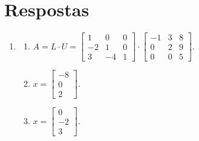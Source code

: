 \documentclass[12pt,a4paper]{article}
\begin{document}
\newpage
\section*{Respostas}
\begin{enumerate}
\item
\begin{enumerate}
\item $A = L \cdot U =
\begin{bmatrix}
 1 &  0 & 0 \\
-2 &  1 & 0 \\
 3 & -4 & 1
\end{bmatrix}
\cdot
\begin{bmatrix}
-1 & 3 & 8 \\
 0 & 2 & 9 \\
 0 & 0 & 5
\end{bmatrix}
$.

\item
$ x = \begin{bmatrix}
-8 \\ 0 \\ 2
\end{bmatrix}$.
\item
$ x = \begin{bmatrix}
0 \\ -2 \\ 3
\end{bmatrix}$.
\end{enumerate}


\end{enumerate}
\end{document}
